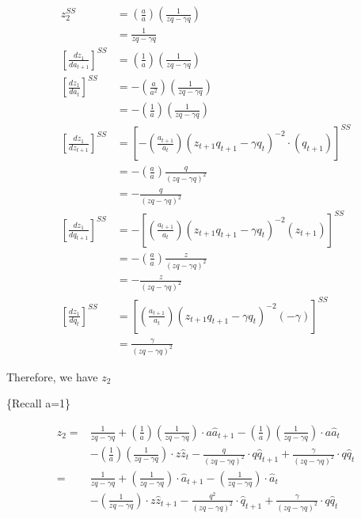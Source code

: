 \documentclass[11pt,preprint, authoryear]{elsarticle}
\numberwithin{equation}{section}
\numberwithin{figure}{section}
\numberwithin{table}{section}
\begin{document}
\[\begin{aligned}
z_{2}^{SS} &= \left(\frac{a}{a}\right)\left(\frac{1}{z q-\gamma q}\right) \\
&= \frac{1}{z q-\gamma q}\\
\left[\frac{dz_{1}}{da_{t+1}} \right]^{SS} &= \left(\frac{1}{a}\right)\left(\frac{1}{z q-\gamma q}\right)\\
\left[\frac{dz_{1}}{da_{t}} \right]^{SS} &= 
- \left(\frac{a}{a^{2}}\right)\left(\frac{1}{z q-\gamma q}\right)\\
&= -\left(\frac{1}{a}\right)\left(\frac{1}{z q-\gamma q}\right)\\
\left[\frac{dz_{1}}{dz_{t+1}} \right]^{SS} &= \left[-\left(\frac{a_{t+1}}{a_{t}}\right)\left(z_{t+1} q_{t+1}-\gamma q_{t}\right)^{-2} \cdot\left(q_{t+1}\right) \right]^{SS} \\
&=-\left(\frac{a}{a}\right) \frac{q}{(zq-\gamma q)^2}\\
&= -\frac{q}{(zq-\gamma q)^2}\\
\left[\frac{dz_{1}}{dq_{t+1}} \right]^{SS} &= -\left[\left(\frac{a_{t+1}}{a_{t}}\right)\left(z_{t+1} q_{t+1}-\gamma q_{t}\right)^{-2}\left(z_{t+1}\right)\right]^{SS} \\
&=-\left(\frac{a}{a}\right) \frac{z}{(z q-\gamma q)^{2}} \\
&=-\frac{z}{(z q-\gamma q)^{2}} \\
\left[\frac{dz_{1}}{dq_{t}} \right]^{SS} &= \left[\left(\frac{a_{t+1}}{a_{t}}\right)\left(z_{t+1} q_{t+1}-\gamma q_{t}\right)^{-2}(-\gamma)\right]^{SS} \\
&=\frac{\gamma}{(z q-\gamma q)^{2}}
\end{aligned}\]

Therefore, we have \(z_2\)

\{Recall a=1\}

\[\begin{aligned}
z_2 =& \frac{1}{z q-\gamma q}
+ \left(\frac{1}{a}\right)\left(\frac{1}{z q-\gamma q}\right) \cdot a \hat{a}_{t+1}
-\left(\frac{1}{a}\right)\left(\frac{1}{z q-\gamma q}\right) \cdot a \hat{a}_{t}\\
&-\left(\frac{1}{a}\right)\left(\frac{1}{z q-\gamma q}\right) \cdot z\hat{z}_{t}
-\frac{q}{(zq-\gamma q)^2} \cdot q \hat{q}_{t+1}
+\frac{\gamma}{(z q-\gamma q)^{2}} \cdot q \hat{q}_{t}\\
=& \frac{1}{z q-\gamma q}
+ \left(\frac{1}{z q-\gamma q}\right) \cdot \hat{a}_{t+1}
-\left(\frac{1}{z q-\gamma q}\right) \cdot \hat{a}_{t}\\
&-\left(\frac{1}{z q-\gamma q}\right) \cdot z\hat{z}_{t+1}
-\frac{q^2}{(zq-\gamma q)^2} \cdot \hat{q}_{t+1}
+\frac{\gamma}{(z q-\gamma q)^{2}} \cdot q \hat{q}_{t}
\end{aligned}\]
\end{document}
